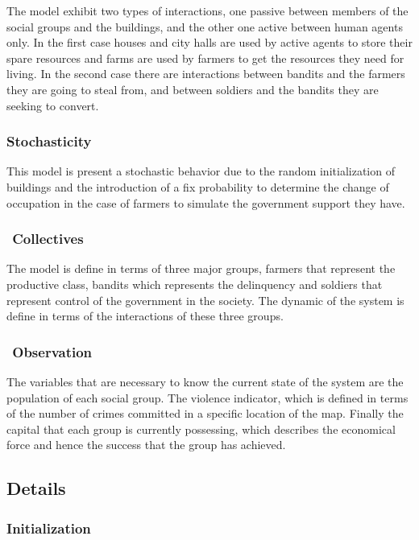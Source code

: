 \documentclass{wscpaperproc}
\begin{document}
The model exhibit two types of interactions, one passive between members of the
social groups and the buildings, and the other one active between human agents
only. In the first case houses and city halls are used by active agents to
store their spare resources and farms are used by farmers to get the resources
they need for living. In the second case there are interactions between
bandits and the farmers they are going to steal from, and between soldiers and
the bandits they are seeking to convert.

\subsubsection{Stochasticity}

This model is present a stochastic behavior due to the random initialization of
buildings and the introduction of a fix probability to determine the change of
occupation in the case of farmers to simulate the government support they have.

\subsubsection{$\ \ $Collectives}

The model is define in terms of three major groups, farmers that represent
the productive class, bandits which represents the delinquency and soldiers
that represent control of the government in the society. The dynamic of the
system is define in terms of the interactions of these three groups.

\subsubsection{$\ \ $Observation}

The variables that are necessary to know the current state of the system are
the population of each social group. The violence indicator, which is defined
in terms of the number of crimes committed in a specific location of the map.
Finally the capital that each group is currently possessing, which describes the
economical force and hence the success that the group has achieved.

\subsection{Details}

\subsubsection{Initialization}
\end{document}

